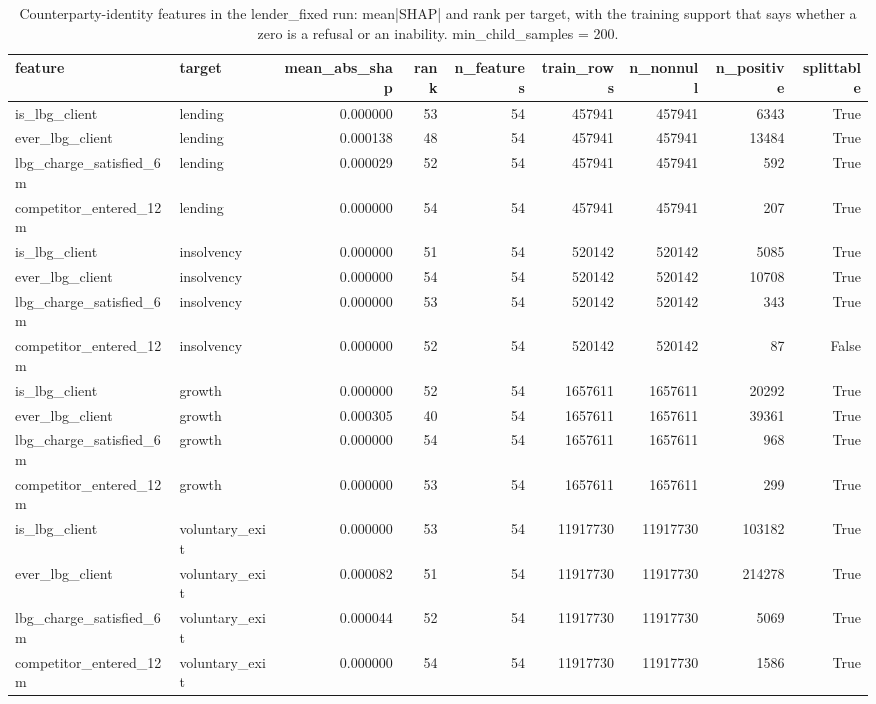 \begin{table}
\caption{Counterparty-identity features in the lender_fixed run: mean|SHAP| and rank per target, with the training support that says whether a zero is a refusal or an inability. min_child_samples = 200.}
\label{tab:shap_lender_identity_receipt}
\begin{tabular}{llrrrrrrr}
\toprule
feature & target & mean_abs_shap & rank & n_features & train_rows & n_nonnull & n_positive & splittable \\
\midrule
is_lbg_client & lending & 0.000000 & 53 & 54 & 457941 & 457941 & 6343 & True \\
ever_lbg_client & lending & 0.000138 & 48 & 54 & 457941 & 457941 & 13484 & True \\
lbg_charge_satisfied_6m & lending & 0.000029 & 52 & 54 & 457941 & 457941 & 592 & True \\
competitor_entered_12m & lending & 0.000000 & 54 & 54 & 457941 & 457941 & 207 & True \\
is_lbg_client & insolvency & 0.000000 & 51 & 54 & 520142 & 520142 & 5085 & True \\
ever_lbg_client & insolvency & 0.000000 & 54 & 54 & 520142 & 520142 & 10708 & True \\
lbg_charge_satisfied_6m & insolvency & 0.000000 & 53 & 54 & 520142 & 520142 & 343 & True \\
competitor_entered_12m & insolvency & 0.000000 & 52 & 54 & 520142 & 520142 & 87 & False \\
is_lbg_client & growth & 0.000000 & 52 & 54 & 1657611 & 1657611 & 20292 & True \\
ever_lbg_client & growth & 0.000305 & 40 & 54 & 1657611 & 1657611 & 39361 & True \\
lbg_charge_satisfied_6m & growth & 0.000000 & 54 & 54 & 1657611 & 1657611 & 968 & True \\
competitor_entered_12m & growth & 0.000000 & 53 & 54 & 1657611 & 1657611 & 299 & True \\
is_lbg_client & voluntary_exit & 0.000000 & 53 & 54 & 11917730 & 11917730 & 103182 & True \\
ever_lbg_client & voluntary_exit & 0.000082 & 51 & 54 & 11917730 & 11917730 & 214278 & True \\
lbg_charge_satisfied_6m & voluntary_exit & 0.000044 & 52 & 54 & 11917730 & 11917730 & 5069 & True \\
competitor_entered_12m & voluntary_exit & 0.000000 & 54 & 54 & 11917730 & 11917730 & 1586 & True \\
\bottomrule
\end{tabular}
\end{table}
